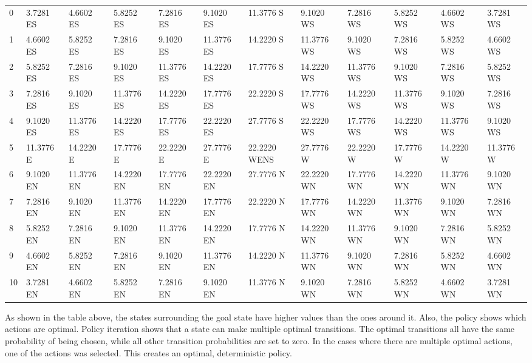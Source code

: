 \documentclass{article}
\begin{document}
\begin{center}
{\begin{tabular}{ |l | l | l | l | l | l | l | l | l | l | l | l|}
\hline
0 & 3.7281  ES &  4.6602  ES &  5.8252  ES &  7.2816  ES &  9.1020  ES &  11.3776  S &  9.1020  WS &  7.2816  WS &  5.8252  WS &  4.6602  WS &  3.7281  WS  \\
1 & 4.6602  ES &  5.8252  ES &  7.2816  ES &  9.1020  ES &  11.3776  ES &  14.2220  S &  11.3776  WS &  9.1020  WS &  7.2816  WS &  5.8252  WS &  4.6602  WS  \\
2 & 5.8252  ES &  7.2816  ES &  9.1020  ES &  11.3776  ES &  14.2220  ES &  17.7776  S &  14.2220  WS &  11.3776  WS &  9.1020  WS &  7.2816  WS &  5.8252  WS  \\
3 & 7.2816  ES &  9.1020  ES &  11.3776  ES &  14.2220  ES &  17.7776  ES &  22.2220  S &  17.7776  WS &  14.2220  WS &  11.3776  WS &  9.1020  WS &  7.2816  WS  \\
4 & 9.1020  ES &  11.3776  ES &  14.2220  ES &  17.7776  ES &  22.2220  ES &  27.7776  S &  22.2220  WS &  17.7776  WS &  14.2220  WS &  11.3776  WS &  9.1020  WS  \\
5 & 11.3776  E &  14.2220  E &  17.7776  E &  22.2220  E &  27.7776  E &  \cellcolor{red!40}22.2220  WENS &  27.7776  W &  22.2220  W &  17.7776  W &  14.2220  W &  11.3776  W  \\
6 & 9.1020  EN &  11.3776  EN &  14.2220  EN &  17.7776  EN &  22.2220  EN &  27.7776  N &  22.2220  WN &  17.7776  WN &  14.2220  WN &  11.3776  WN &  9.1020  WN  \\
7 & 7.2816  EN &  9.1020  EN &  11.3776  EN &  14.2220  EN &  17.7776  EN &  22.2220  N &  17.7776  WN &  14.2220  WN &  11.3776  WN &  9.1020  WN &  7.2816  WN  \\
8 & 5.8252  EN &  7.2816  EN &  9.1020  EN &  11.3776  EN &  14.2220  EN &  17.7776  N &  14.2220  WN &  11.3776  WN &  9.1020  WN &  7.2816  WN &  5.8252  WN  \\
9 & 4.6602  EN &  5.8252  EN &  7.2816  EN &  9.1020  EN &  11.3776  EN &  14.2220  N &  11.3776  WN &  9.1020  WN &  7.2816  WN &  5.8252  WN &  4.6602  WN  \\
10 & 3.7281  EN &  4.6602  EN &  5.8252  EN &  7.2816  EN &  9.1020  EN &  11.3776  N &  9.1020  WN &  7.2816  WN &  5.8252  WN &  4.6602  WN &  3.7281  WN  \\
\hline
	\end{tabular}
	}
\end{center}

As shown in the table above, the states surrounding the goal state have higher values than the ones around it. Also, the policy shows which actions are optimal. Policy iteration shows that a state can make multiple optimal transitions. The optimal transitions all have the same probability of being chosen, while all other transition probabilities are set to zero. In the cases where there are multiple optimal actions, one of the actions was selected. This creates an optimal, deterministic policy.
\end{document}
